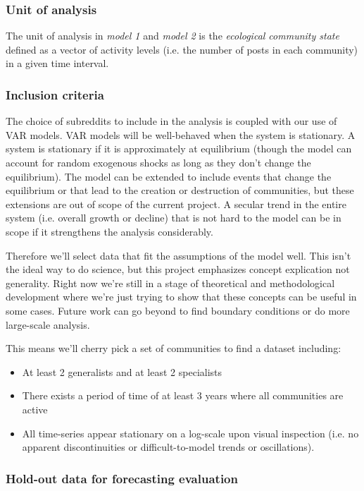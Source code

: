 \documentclass[12pt]{memoir}
\begin{document}
 \subsubsection{Unit of analysis}
 
The unit of analysis in \emph{model 1} and \emph{model 2} is the \emph{ecological community state} defined as a vector of activity levels (i.e. the number of posts in each community) in a given time interval. 

\subsubsection{Inclusion criteria}
The choice of subreddits to include in the analysis is coupled with our use of VAR models.  VAR models will be well-behaved when the system is stationary.  A system is stationary if it is approximately at equilibrium (though the model can account for random exogenous shocks as long as they don't change the equilibrium).  The model can be extended to include events that change the equilibrium or that lead to the creation or destruction of communities, but these extensions are out of scope of the current project.   A secular trend in the entire system (i.e. overall growth or decline) that is not hard to the model can be in scope if it strengthens the analysis considerably. 

Therefore we'll select data that fit the assumptions of the model well.  This isn't the ideal way to do science, but this project emphasizes concept explication not generality.  Right now we're still in a stage of theoretical and methodological development where we're just trying to show that these concepts can be useful in some cases. Future work can go beyond to find boundary conditions or do more large-scale analysis. 

This means we'll cherry pick a set of communities to find a dataset including:

\begin{itemize}
\item At least 2 generalists and at least 2 specialists
\item There exists a period of time of at least 3 years where all communities are active
\item All time-series appear stationary on a log-scale upon visual inspection (i.e. no apparent discontinuities or difficult-to-model trends or oscillations).
\end{itemize}

\subsubsection{Hold-out data for forecasting evaluation}
\end{document}

